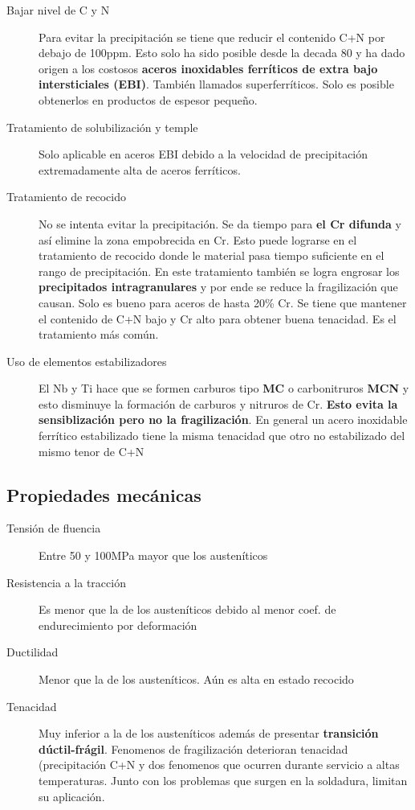 \begin{description}
	\item[Bajar nivel de C y N]  Para evitar la precipitación se tiene que reducir el contenido C+N por debajo de 100ppm. Esto solo ha sido posible desde la decada 80 y ha dado origen a los costosos \textbf{aceros inoxidables ferríticos de extra bajo intersticiales (EBI)}. También llamados superferríticos. Solo es posible obtenerlos en productos de espesor pequeño.
	\item[Tratamiento de solubilización y temple] Solo aplicable en aceros EBI debido a la velocidad de precipitación extremadamente alta de aceros ferríticos.
	\item[Tratamiento de recocido] No se intenta evitar la precipitación. Se da tiempo para \textbf{el Cr difunda} y así elimine la zona empobrecida en Cr. Esto puede lograrse en el tratamiento de recocido donde le material pasa tiempo suficiente en el rango de precipitación. En este tratamiento también se logra engrosar los \textbf{precipitados intragranulares} y por ende se reduce la fragilización que causan. Solo es bueno para aceros de hasta 20\% Cr. Se tiene que mantener el contenido de C+N bajo y Cr alto para obtener buena tenacidad. Es el tratamiento más común.
	\item[Uso de elementos estabilizadores] El Nb y Ti hace que se formen carburos tipo \textbf{MC} o carbonitruros \textbf{MCN} y esto disminuye la formación de carburos y nitruros de Cr. \textbf{Esto evita la sensiblización pero no la fragilización}. En general un acero inoxidable ferrítico estabilizado tiene la misma tenacidad que otro no estabilizado del mismo tenor de C+N
\end{description}

\subsection{Propiedades mecánicas}

\begin{description}
	\item[Tensión de fluencia]  Entre 50 y 100MPa mayor que los austeníticos
	\item[Resistencia a la tracción] Es menor que la de los austeníticos debido al menor coef. de endurecimiento por deformación
	\item[Ductilidad] Menor que la de los austeníticos. Aún es alta en estado recocido
	\item[Tenacidad] Muy inferior a la de los austeníticos además de presentar \textbf{transición dúctil-frágil}. Fenomenos de fragilización deterioran tenacidad (precipitación C+N y dos fenomenos que ocurren durante servicio a altas temperaturas. Junto con los problemas que surgen en la soldadura, limitan su aplicación.
\end{description}


